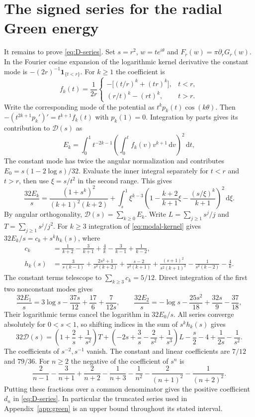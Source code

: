 \documentclass[11pt,a4paper,reqno]{amsart}
\theoremstyle{remark}
\numberwithin{equation}{section}
\newcommand{\dd}{\,\mathrm d}
\begin{document}
\section{The signed series for the radial Green energy}\label{app:series}
It remains to prove \eqref{eq:D-series}. Set $s=r^2$, $w=t e^{i\theta}$ and
$F_r(w)=\pi\partial_r G_r(w)$. In the Fourier cosine expansion of the
logarithmic kernel derivative the constant mode is
$-(2r)^{-1}\mathbf 1_{\{t<r\}}$. For $k\ge1$ the coefficient is
\[
  f_k(t)=\frac{1}{2r}\begin{cases}
    -\bigl[(t/r)^k+(tr)^k\bigr], & t<r,\\[3pt]
    (r/t)^k-(rt)^k, & t>r.
  \end{cases}
\]
Write the corresponding mode of the potential as $t^k p_k(t)\cos(k\theta)$.
Then $-(t^{2k+1}p_k')'=t^{k+1}f_k(t)$ with $p_k(1)=0$. Integration by
parts gives its contribution to $\mathcal D(s)$ as
\[
  E_k=\int_0^1 t^{-2k-1}\left(\int_0^t f_k(v)v^{k+1}\dd v\right)^2\dd t,
\]
The constant mode has twice the angular normalization and contributes
$E_0=s(1-2\log s)/32$. Evaluate the inner integral separately for $t<r$
and $t>r$, then use $\xi=s/t^2$ in the second range. This gives
\begin{equation}\label{eq:modal-kernel}
  \frac{32E_k}{s}=\frac{(1+s^k)^2}{(k+1)^2(k+2)}
    +\int_s^1\xi^{k-3}\left(1-\frac{k+2}{k+1}\xi-\frac{(s/\xi)^k}{k+1}\right)^2\dd\xi.
\end{equation}
By angular orthogonality, $\mathcal D(s)=\sum_{k\ge0}E_k$. Write
$L=\sum_{j\ge1}s^j/j$ and $T=\sum_{j\ge1}s^j/j^2$.
For $k\ge3$ integration of \eqref{eq:modal-kernel} gives
$32E_k/s=c_k+s^kh_k(s)$, where
\begin{align*}
  c_k &= \frac{1}{k+2}-\frac{3}{k+1}+\frac{4}{k}-\frac{3}{k-1}+\frac{1}{k-2},\\
  h_k(s) &= \frac{3}{s(k-1)}+\frac{2s^2+1}{s^2(k+2)}
    +\frac{s-2}{s^2(k+1)}+\frac{(s+1)^2}{s^2(k+1)^2}
    -\frac{1}{s^2(k-2)}-\frac{4}{k}.
\end{align*}
The constant terms telescope to $\sum_{k\ge3}c_k=5/12$. Direct integration
of the first two nonconstant modes gives
\[
  \frac{32E_1}{s}=3\log s-\frac{37s}{12}+\frac{17}{6}+\frac{7}{12s},
  \qquad
  \frac{32E_2}{s}=-\log s-\frac{25s^2}{18}+\frac{32s}{9}-\frac{37}{18},
\]
Their logarithmic terms cancel the logarithm in $32E_0/s$. All series
converge absolutely for $0<s<1$, so shifting indices in the sum of
$s^kh_k(s)$ gives
\[
  32\mathcal D(s)=\left(1+\frac{2}{s}+\frac{1}{s^2}\right)T
    +\left(-2s+\frac{3}{s}-\frac{2}{s^2}+\frac{1}{s^3}\right)L
    -\frac{s}{2}-4+\frac{1}{2s}-\frac{1}{s^2}.
\]
The coefficients of $s^{-2},s^{-1}$ vanish. The constant and linear
coefficients are $7/12$ and $79/36$. For $n\ge2$ the negative of the
coefficient of $s^n$ is
\[
  \frac{2}{n-1}-\frac{3}{n+1}+\frac{2}{n+2}-\frac{1}{n+3}
    -\frac{1}{n^2}-\frac{2}{(n+1)^2}-\frac{1}{(n+2)^2}.
\]
Putting these fractions over a common denominator gives the positive
coefficient $d_n$ in \eqref{eq:D-series}. In particular the truncated
series used in Appendix~\ref{app:green} is an upper bound throughout its
stated interval.
\end{document}

